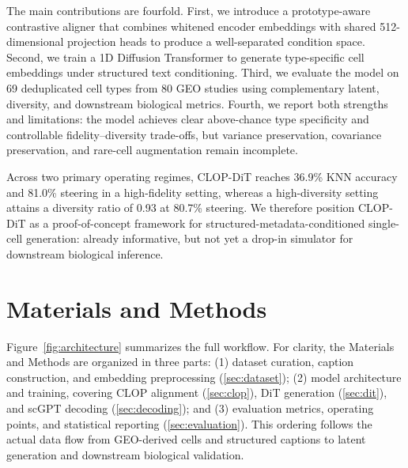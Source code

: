 \documentclass[fleqn,10pt,lineno]{wlpeerj}
\begin{document}
The main contributions are fourfold. First, we introduce a prototype-aware contrastive aligner that combines whitened encoder embeddings with shared 512-dimensional projection heads to produce a well-separated condition space. Second, we train a 1D Diffusion Transformer to generate type-specific cell embeddings under structured text conditioning. Third, we evaluate the model on 69 deduplicated cell types from 80 GEO studies using complementary latent, diversity, and downstream biological metrics. Fourth, we report both strengths and limitations: the model achieves clear above-chance type specificity and controllable fidelity--diversity trade-offs, but variance preservation, covariance preservation, and rare-cell augmentation remain incomplete.

Across two primary operating regimes, CLOP-DiT reaches 36.9\% KNN accuracy and 81.0\% steering in a high-fidelity setting, whereas a high-diversity setting attains a diversity ratio of 0.93 at 80.7\% steering. We therefore position CLOP-DiT as a proof-of-concept framework for structured-metadata-conditioned single-cell generation: already informative, but not yet a drop-in simulator for downstream biological inference.

\section*{Materials and Methods}

Figure~\ref{fig:architecture} summarizes the full workflow. For clarity, the Materials and Methods are organized in three parts: (1) dataset curation, caption construction, and embedding preprocessing (\ref{sec:dataset}); (2) model architecture and training, covering CLOP alignment (\ref{sec:clop}), DiT generation (\ref{sec:dit}), and scGPT decoding (\ref{sec:decoding}); and (3) evaluation metrics, operating points, and statistical reporting (\ref{sec:evaluation}). This ordering follows the actual data flow from GEO-derived cells and structured captions to latent generation and downstream biological validation.
\end{document}
